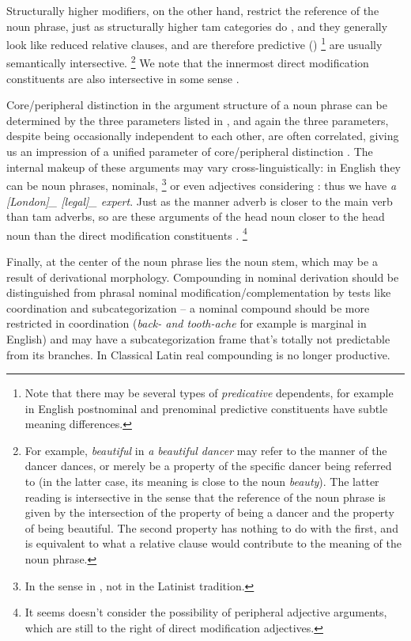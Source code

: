 \documentclass[a4paper, oneside, 12pt]{report}
\newcommand*{\citechap}[1]{chap.~{#1}}
\newcommand*{\citepage}[1]{p.~{#1}}
\newcommand*{\citepages}[1]{pp.~{#1}}
\newcommand*{\term}[1]{\emph{#1}}
\newcommand{\form}[1]{\emph{#1}}
\begin{document}
Structurally higher modifiers, on the other hand, restrict the reference of the noun phrase,
just as structurally higher \ac{tam} categories do
\citep[\citepages{23,25}]{cinque2010syntax},
and they generally look like reduced relative clauses,
and are therefore predictive
(\citealt[\citechap{5}]{cinque2010syntax})%
\footnote{
    Note that there may be several types of \term{predicative} dependents,
    for example in English postnominal and prenominal predictive constituents have subtle meaning differences.
}
are usually semantically intersective.%
\footnote{
    For example, \form{beautiful} in \form{a beautiful dancer}
    may refer to the manner of the dancer dances,
    or merely be a property of the specific dancer being referred to
    (in the latter case, its meaning is close to the noun \form{beauty}).
    The latter reading is intersective in the sense
    that the reference of the noun phrase is given by the intersection
    of the property of being a dancer and the property of being beautiful. 
    The second property has nothing to do with the first,
    and is equivalent to what a relative clause would contribute to the meaning of the noun phrase.
}
We note that the innermost direct modification constituents are also intersective in some sense 
\citep[\citepage{476}]{devine2006latin}.

Core/peripheral distinction in the argument structure of a noun phrase can be determined 
by the three parameters listed in ,
and again the three parameters, despite being occasionally independent to each other,
are often correlated,
giving us an impression of a unified parameter of core/peripheral distinction
\citep[\citepages{439-443}]{cgel}.
The internal makeup of these arguments may vary cross-linguistically:
in English they can be noun phrases, nominals,%
\footnote{
    In the sense in \citet{cgel}, not in the Latinist tradition.
}
or even adjectives considering \citep[\citepages{439-440}]{cgel}: thus we have \form{a [London]_{} [legal]_{\text{argument}} expert}.
Just as the manner adverb is closer to the main verb than \ac{tam} adverbs,
so are these arguments of the head noun closer to the head noun
than the direct modification constituents \citep[\citepage{452}, {[2]}]{cgel}.%
\footnote{
    It seems \citet{cgel} doesn't consider the possibility of peripheral adjective arguments,
    which are still to the right of direct modification adjectives.
}

Finally, at the center of the noun phrase lies the noun stem,
which may be a result of derivational morphology.
Compounding in nominal derivation should be distinguished from
phrasal nominal modification/complementation
by tests like coordination and subcategorization
-- a nominal compound should be more restricted in coordination
(\form{back- and tooth-ache} for example is marginal in English)
and may have a subcategorization frame that's totally not predictable
from its branches.
In Classical Latin real compounding is no longer productive.
\end{document}
